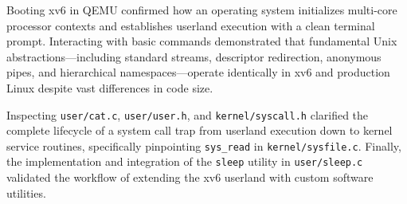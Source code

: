 \documentclass[12pt,a4paper]{report}
\numberwithin{equation}{chapter}
\numberwithin{figure}{chapter}
\numberwithin{table}{chapter}
\begin{document}
Booting xv6 in QEMU confirmed how an operating system initializes multi-core processor contexts and establishes userland execution with a clean terminal prompt. Interacting with basic commands demonstrated that fundamental Unix abstractions---including standard streams, descriptor redirection, anonymous pipes, and hierarchical namespaces---operate identically in xv6 and production Linux despite vast differences in code size. 

Inspecting \texttt{user/cat.c}, \texttt{user/user.h}, and \texttt{kernel/syscall.h} clarified the complete lifecycle of a system call trap from userland execution down to kernel service routines, specifically pinpointing \texttt{sys\_read} in \texttt{kernel/sysfile.c}. Finally, the implementation and integration of the \texttt{sleep} utility in \texttt{user/sleep.c} validated the workflow of extending the xv6 userland with custom software utilities.
\end{document}
